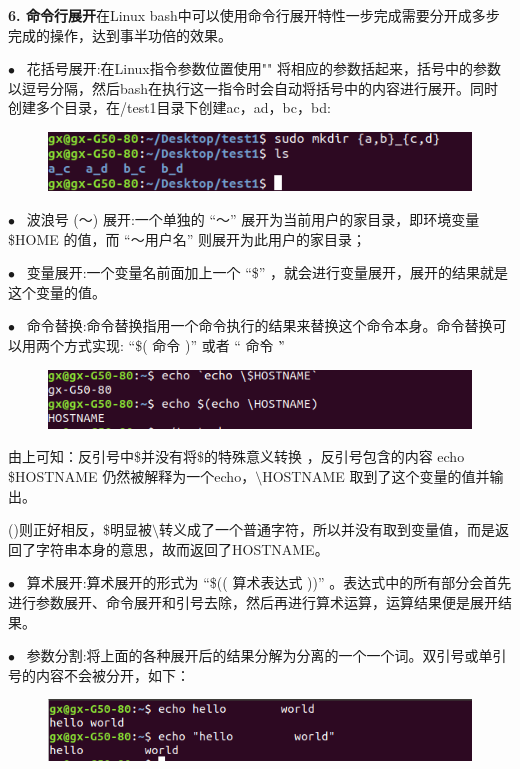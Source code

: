 \documentclass[12pt，a4paper]{article}
\numberwithin{equation}{section}
\begin{document}
\textbf{6. 命令行展开}在Linux bash中可以使用命令行展开特性一步完成需要分开成多步完成的操作，达到事半功倍的效果。

$\bullet$~ 花括号展开:在Linux指令参数位置使用"{}" 将相应的参数括起来，括号中的参数以逗号分隔，然后bash在执行这一指令时会自动将括号中的内容进行展开。同时创建多个目录，在/test1目录下创建ac，ad，bc，bd:
\begin{figure}[H]
\centering
\includegraphics[scale=0.6]{./figures/244.png}
\end{figure}
$\bullet$~ 波浪号 (～) 展开:一个单独的 “～” 展开为当前用户的家目录，即环境变量 \$HOME 的值，而 “～用户名” 则展开为此用户的家目录；

$\bullet$~ 变量展开:一个变量名前面加上一个 “\$” ，就会进行变量展开，展开的结果就是这个变量的值。

$\bullet$~ 命令替换:命令替换指用一个命令执行的结果来替换这个命令本身。命令替换可以用两个方式实现: “\$( 命令 )” 或者 “ \` 命令 \` ”
\begin{figure}[H]
\centering
\includegraphics[scale=0.6]{./figures/294.png}
\end{figure}
由上可知：反引号中\$并没有将\$的特殊意义转换 ，反引号包含的内容 echo \$HOSTNAME 仍然被解释为一个echo，$\setminus$HOSTNAME 取到了这个变量的值并输出。

()则正好相反，\$明显被$\setminus$转义成了一个普通字符，所以并没有取到变量值，而是返回了字符串本身的意思，故而返回了HOSTNAME。

$\bullet$~ 算术展开:算术展开的形式为 “\$(( 算术表达式 ))” 。表达式中的所有部分会首先进行参数展开、命令展开和引号去除，然后再进行算术运算，运算结果便是展开结果。

$\bullet$~ 参数分割:将上面的各种展开后的结果分解为分离的一个一个词。双引号或单引号的内容不会被分开，如下：
\begin{figure}[H]
\centering
\includegraphics[scale=0.6]{./figures/295.png}
\end{figure}
\end{document}
